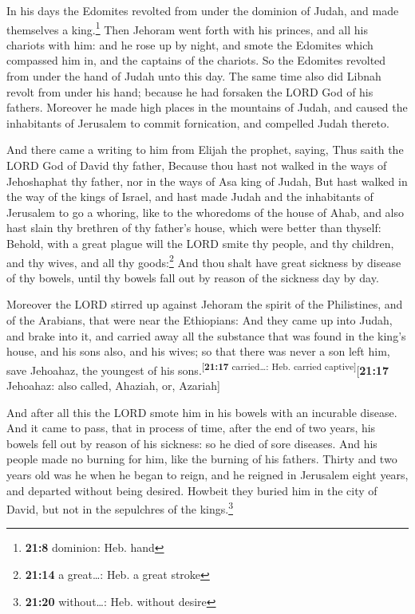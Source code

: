  In his days the Edomites revolted from under the dominion
of Judah, and made themselves a king.\footnote{\textbf{21:8} dominion:
  Heb. hand}  Then Jehoram went forth with his princes,
and all his chariots with him: and he rose up by night, and smote the
Edomites which compassed him in, and the captains of the chariots.
 So the Edomites revolted from under the hand of Judah
unto this day. The same time also did Libnah revolt from under his hand;
because he had forsaken the LORD God of his fathers. 
Moreover he made high places in the mountains of Judah, and caused the
inhabitants of Jerusalem to commit fornication, and compelled Judah
thereto.

 And there came a writing to him from Elijah the prophet,
saying, Thus saith the LORD God of David thy father, Because thou hast
not walked in the ways of Jehoshaphat thy father, nor in the ways of Asa
king of Judah,  But hast walked in the way of the kings
of Israel, and hast made Judah and the inhabitants of Jerusalem to go a
whoring, like to the whoredoms of the house of Ahab, and also hast slain
thy brethren of thy father's house, which were better than thyself:
 Behold, with a great plague will the LORD smite thy
people, and thy children, and thy wives, and all thy goods:\footnote{\textbf{21:14}
  a great\ldots: Heb. a great stroke}  And thou shalt
have great sickness by disease of thy bowels, until thy bowels fall out
by reason of the sickness day by day.

 Moreover the LORD stirred up against Jehoram the spirit
of the Philistines, and of the Arabians, that were near the Ethiopians:
 And they came up into Judah, and brake into it, and
carried away all the substance that was found in the king's house, and
his sons also, and his wives; so that there was never a son left him,
save Jehoahaz, the youngest of his
sons.\textsuperscript{{[}\textbf{21:17} carried\ldots: Heb. carried
captive{]}}{[}\textbf{21:17} Jehoahaz: also called, Ahaziah, or,
Azariah{]}

 And after all this the LORD smote him in his bowels with
an incurable disease.  And it came to pass, that in
process of time, after the end of two years, his bowels fell out by
reason of his sickness: so he died of sore diseases. And his people made
no burning for him, like the burning of his fathers. 
Thirty and two years old was he when he began to reign, and he reigned
in Jerusalem eight years, and departed without being desired. Howbeit
they buried him in the city of David, but not in the sepulchres of the
kings.\footnote{\textbf{21:20} without\ldots: Heb. without desire}

